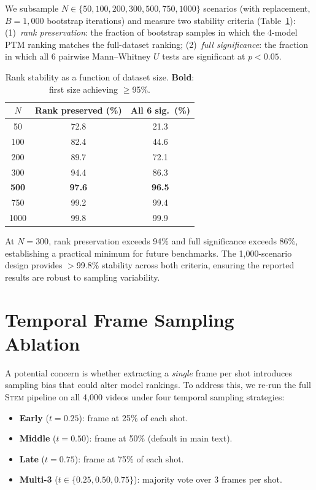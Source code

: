 \documentclass[sigconf,review,anonymous]{acmart}
\newcommand{\stem}{\textsc{Stem}}
\begin{document}
We subsample $N \in \{50, 100, 200, 300, 500, 750, 1000\}$ scenarios (with replacement, $B = 1{,}000$ bootstrap iterations) and measure two stability criteria (Table~\ref{tab:rank_stability}): (1)~\emph{rank preservation}: the fraction of bootstrap samples in which the 4-model PTM ranking matches the full-dataset ranking; (2)~\emph{full significance}: the fraction in which all 6 pairwise Mann--Whitney $U$ tests are significant at $p < 0.05$.
\begin{table}[ht]
\caption{Rank stability as a function of dataset size. \textbf{Bold}: first size achieving $\geq$95\%.}
\label{tab:rank_stability}
\centering
\small
\begin{tabular}{@{}ccc@{}}
\toprule
$N$ & Rank preserved (\%) & All 6 sig.\ (\%) \\
\midrule
50   & 72.8 & 21.3 \\
100  & 82.4 & 44.6 \\
200  & 89.7 & 72.1 \\
300  & 94.4 & 86.3 \\
\textbf{500}  & \textbf{97.6} & \textbf{96.5} \\
750  & 99.2 & 99.4 \\
1000 & 99.8 & 99.9 \\
\bottomrule
\end{tabular}
\end{table}

At $N = 300$, rank preservation exceeds 94\% and full significance exceeds 86\%, establishing a practical minimum for future benchmarks.
The 1,000-scenario design provides $>$99.8\% stability across both criteria, ensuring the reported results are robust to sampling variability.


\section{Temporal Frame Sampling Ablation}
\label{app:temporal_ablation}

A potential concern is whether extracting a \emph{single} frame per shot introduces sampling bias that could alter model rankings. To address this, we re-run the full \stem{} pipeline on all 4{,}000 videos under four temporal sampling strategies:

\begin{itemize}[nosep,leftmargin=*]
\item \textbf{Early} ($t = 0.25$): frame at 25\% of each shot.
\item \textbf{Middle} ($t = 0.50$): frame at 50\% (default in main text).
\item \textbf{Late} ($t = 0.75$): frame at 75\% of each shot.
\item \textbf{Multi-3} ($t \in \{0.25, 0.50, 0.75\}$): majority vote over 3 frames per shot.
\end{itemize}
\end{document}
